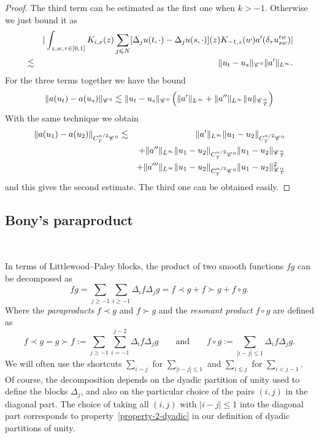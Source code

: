 \documentclass{amsart}
\newcommand{\assign}{:=}
\newcommand{\cdummy}{\cdot}
\newcommand{\tmtextit}[1]{{\itshape{#1}}}
\theoremstyle{remark}
\theoremstyle{definition}
\newcommand{\CC}{\mathscr{C} \hspace{.1em}}
\begin{document}
\begin{proof}
  
  The third term can be estimated as the first one when $k > - 1$. Otherwise
  we just bound it as
  \begin{eqnarray*}
    &  & | \int_{z, w, \tau \in [0, 1]} K_{i, x} (z) \sum_{j \leqslant N}
    [\Delta_j u (t, \cdummy) - \Delta_j u (s, \cdummy)] (z) K_{- 1, z} (w) a'
    (\delta_{\tau} u^{t w}_{s w}) |\\
    & \lesssim & \| u_t - u_s \|_{\CC^0} \| a' \|_{L^{\infty}} .
  \end{eqnarray*}
  For the three terms together we have the bound
  \[ \| a (u_t) - a (u_s) \|_{\CC^0} \lesssim \| u_t - u_s \|_{\CC^0} \left(
     \| a' \|_{L^{\infty}} + \| a'' \|_{L^{\infty}} \| u
     \|_{\CC^{\alpha}_{_T}} \right) \]
  With the same technique we obtain
  \begin{eqnarray*}
    \| a (u_1) - a (u_2) \|_{C_T^{\alpha / 2} \CC^0} & \lesssim & \| a'
    \|_{L^{\infty}} \| u_1 - u_2 \|_{C_T^{\alpha / 2} \CC^0}\\
    &  & + \| a'' \|_{L^{\infty}} \| u_1 - u_2 \|_{C_T^{\alpha / 2} \CC^0} \|
    u_1 - u_2 \|_{\CC^{\alpha}_T}\\
    &  & + \| a''' \|_{L^{\infty}} \| u_1 - u_2 \|_{C_T^{\alpha / 2} \CC^0}
    \| u_1 - u_2 \|^2_{\CC^{\alpha}_T}
  \end{eqnarray*}
  and this gives the second estimate. The third one can be obtained easily.
\end{proof}

\subsection{Bony's paraproduct}\label{ssec:bony}

\

In terms of Littlewood--Paley blocks, the product of two smooth functions
$fg$ can be decomposed as
\[ fg = \sum_{j \geqslant - 1} \sum_{i \geqslant - 1} \Delta_i f \Delta_j g =
   f \prec g + f \succ g + f \circ g. \]
Where the \tmtextit{paraproducts} $f \prec g$ and $f \succ g$ and the
\tmtextit{resonant product} $f \circ g$ are defined as
\[ f \prec g = g \succ f \assign \sum_{j \geqslant - 1} \sum_{i = - 1}^{j - 2}
   \Delta_i f \Delta_j g \qquad \text{and} \qquad f \circ g \assign \sum_{|i -
   j| \leqslant 1} \Delta_i f \Delta_j g. \]
We will often use the shortcuts $\sum_{i \sim j}$ for $\sum_{| i - j |
\leqslant 1}$ and $\sum_{i \lesssim j}$ for $\sum_{i < j - 1}$. Of course, the
decomposition depends on the dyadic partition of unity used to define the
blocks $\Delta_j$, and also on the particular choice of the pairs $(i, j)$ in
the diagonal part. The choice of taking all $(i, j)$ with $|i - j| \leqslant
1$ into the diagonal part corresponds to property~\ref{property-2-dyadic} in
our definition of dyadic partitions of unity.
\end{document}
